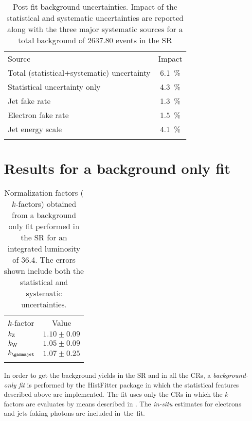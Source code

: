 \begin{table}[pt]
\centering
\begin{tabular}{lc}
\noalign{\smallskip}\toprule\noalign{\smallskip}
Source & Impact\\
\noalign{\smallskip}\midrule\noalign{\smallskip}
Total (statistical+systematic) uncertainty & \SI{6.1}{\percent}\\
Statistical uncertainty only & \SI{4.3}{\percent}\\
Jet fake rate & \SI{1.3}{\percent}\\
Electron fake rate& \SI{1.5}{\percent}\\ 
Jet energy scale& \SI{4.1}{\percent}\\
\noalign{\smallskip}\bottomrule\noalign{\smallskip}
\end{tabular}
\caption{Post fit background uncertainties. Impact of the statistical and systematic uncertainties are reported along with the three major systematic sources for a total background of $2637.80$ events in the SR}
\label{table:sys}
\end{table}

\section{Results for a background only fit}
\begin{table}[t]
\centering
\begin{tabular}{lc}
\noalign{\smallskip}\toprule\noalign{\smallskip}
$k$-factor&Value\\
\noalign{\smallskip}\midrule\noalign{\smallskip}
$k_{\textup{Z}}$& $1.10\pm0.09$\\
$k_{\textup{W}}$& $1.05\pm0.09$\\
$k_{\textup{\gammajet}}$& $1.07\pm0.25$\\
\noalign{\smallskip}\bottomrule\noalign{\smallskip}
\end{tabular}
\caption{Normalization factors ($k$-factors) obtained from a background only fit performed in the SR for an integrated luminosity of \SI{36.4}{\ifb}. The errors shown include both the statistical and systematic uncertainties.}
\label{tab:kfactors}
\end{table}
In order to get the background yields in the SR and in all the CRs, a \emph{background-only fit} is performed by the HistFitter package in which the statistical features described above are implemented. The fit uses only the CRs in which the $k$-factors are evaluates by means described in \Sect{\ref{sec:kfactor}}. The \emph{in-situ} estimates for electrons and jets faking photons are included \mbox{in the fit}. 

